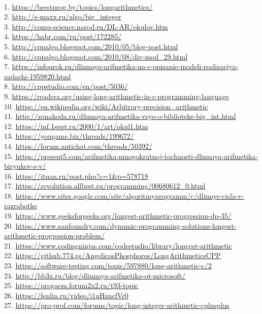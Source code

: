 \documentclass[a4paper]{article}
\begin{document}
\begin{flushleft}
\\
1. \url{https://brestprog.by/topics/longarithmetics/}\\
2. \url{http://e-maxx.ru/algo/big_integer}\\
3. \url{http://comp-science.narod.ru/DL-AR/okulov.htm}\\
4. \url{https://habr.com/ru/post/172285/}\\
5. \url{http://cppalgo.blogspot.com/2010/05/blog-post.html}\\
6. \url{http://cppalgo.blogspot.com/2010/08/div-mod_29.html}\\
7. \url{https://infourok.ru/dlinnaya-arifmetika-na-c-opisanie-modeli-realizaciya-zadachi-1959820.html}\\
8. \url{http://cppstudio.com/en/post/5036/}\\
9. \url{https://readera.org/using-long-arithmetic-in-c-programming-language}\\
10. \url{https://en.wikipedia.org/wiki/Arbitrary-precision_arithmetic}\\
11. \url{http://zonakoda.ru/dlinnaya-arifmetika-vsyo-o-biblioteke-big_int.html}\\
12. \url{https://inf.1sept.ru/2000/1/art/okul1.htm}\\
13. \url{https://yougame.biz/threads/199672/}\\
14. \url{https://forum.antichat.com/threads/50392/}\\
15. \url{https://present5.com/arifmetika-mnogokratnoj-tochnosti-dlinnaya-arifmetika-biryukov-s-v/}\\
16. \url{https://itnan.ru/post.php?c=1&p=578718}\\
17. \url{https://revolution.allbest.ru/programming/00680612_0.html}\\
18. \url{https://www.sites.google.com/site/algoritmyprogramm/c/dlinnye-cisla-v-razrabotke}\\
19. \url{https://www.geeksforgeeks.org/longest-arithmetic-progression-dp-35/}\\
20. \url{https://www.sanfoundry.com/dynamic-programming-solutions-longest-arithmetic-progression-problem/}\\
21. \url{https://www.codingninjas.com/codestudio/library/longest-arithmetic}\\
22. \url{https://github.774.gs/AngelicosPhosphoros/LongArithmeticsCPP}\\
23. \url{https://software-testing.com/topic/597880/long-arithmetic-c/2}\\
24. \url{http://bb3x.ru/blog/dlinnaya-arifmetika-ot-microsoft/}\\
25. \url{https://progaem.forum2x2.ru/t93-topic}\\
26. \url{https://fenlin.ru/video/i1uHzncfVr0}\\
27. \url{https://pro-prof.com/forums/topic/long-integer-arithmetic-cplusplus}\\
\end{flushleft}
\end{document}
